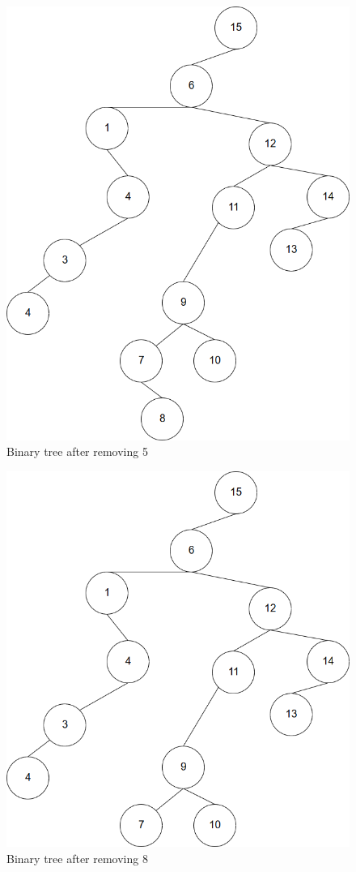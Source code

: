 \documentclass{article}
\begin{document}
\begin{enumerate}
    \begin{figure}[H]
 	  \centering
 	  \caption{Binary tree after removing 5}
 	  \label{Trees:BinaryTreeR1}
	  \includegraphics[width=\textwidth]{BinaryR1}
    \end{figure}
    \begin{figure}[H]
 	  \centering
 	  \caption{Binary tree after removing 8}
 	  \label{Trees:BinaryTreeR2}
	  \includegraphics[width=\textwidth]{BinaryR2}

\end{figure}
\end{enumerate}
\end{document}
